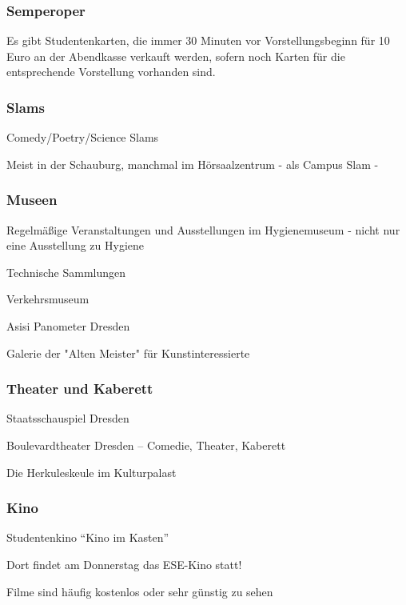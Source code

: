 \documentclass[a4paper,12pt]{report}
\begin{document}
\subsubsection{Semperoper}
\begin{itemize*}
	\item Es gibt Studentenkarten, die immer 30 Minuten vor Vorstellungsbeginn für 10 Euro an der Abendkasse verkauft werden, sofern noch Karten für die entsprechende Vorstellung vorhanden sind.
\end{itemize*}

\subsubsection{Slams}
\begin{itemize*}
	\item Comedy/Poetry/Science Slams
	\item Meist in der Schauburg, manchmal im Hörsaalzentrum - als Campus Slam -
\end{itemize*}

\subsubsection{Museen}
\begin{itemize*}
	\item Regelmäßige Veranstaltungen und Ausstellungen im Hygienemuseum - nicht nur eine Ausstellung zu Hygiene
	\item Technische Sammlungen
	\item Verkehrsmuseum 
	\item Asisi Panometer Dresden
	\item Galerie der "Alten Meister" für Kunstinteressierte
\end{itemize*}

\subsubsection{Theater und Kaberett}
\begin{itemize*}
	\item Staatsschauspiel Dresden
	\item Boulevardtheater Dresden -- Comedie, Theater, Kaberett
	\item Die Herkuleskeule im Kulturpalast
\end{itemize*}

\subsubsection{Kino}
\begin{itemize*}
	\item Studentenkino \enquote{Kino im Kasten}
	\item Dort findet am Donnerstag das ESE-Kino statt!
	\item Filme sind häufig kostenlos oder sehr günstig zu sehen
\end{itemize*}
\end{document}
